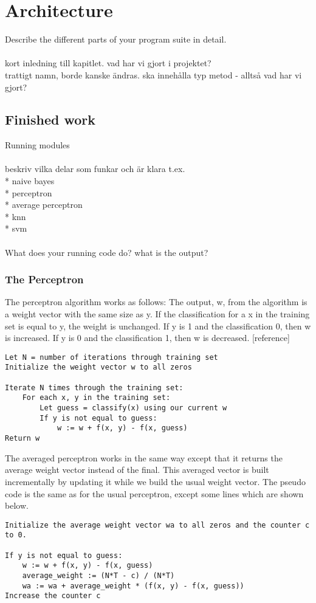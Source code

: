 \chapter{Architecture}
Describe the different parts of your program suite in detail.
\\\\
kort inledning till kapitlet. vad har vi gjort i projektet?\\
trattigt namn, borde kanske ändras. ska innehålla typ metod - alltså vad har vi gjort?

\section{Finished work}
Running modules
\\\\
beskriv vilka delar som funkar och är klara t.ex.\\
* naive bayes\\
* perceptron\\
* average perceptron\\
* knn\\
* svm
\\\\
What does your running code do? what is the output?

\subsection{The Perceptron}
The perceptron algorithm works as follows: 
The output, w, from the algorithm is a weight vector with the same size as y. If the classification for a x in the training set is equal to y, the weight is unchanged.
If y is 1 and the classification 0, then w is increased. If y is 0 and the classification 1, then w is decreased. [reference]
\begin{verbatim}
Let N = number of iterations through training set
Initialize the weight vector w to all zeros

Iterate N times through the training set:
    For each x, y in the training set:
        Let guess = classify(x) using our current w
        If y is not equal to guess:
            w := w + f(x, y) - f(x, guess)
Return w
\end{verbatim}
The averaged perceptron works in the same way except that it returns the average weight vector instead of the final.
This averaged vector is built incrementally by updating it while we build the usual weight vector. The pseudo code is the same as for the usual perceptron, except some lines which are shown below.
\begin{verbatim}
Initialize the average weight vector wa to all zeros and the counter c to 0.

If y is not equal to guess:
    w := w + f(x, y) - f(x, guess)
    average_weight := (N*T - c) / (N*T)
    wa := wa + average_weight * (f(x, y) - f(x, guess))
Increase the counter c
\end{verbatim}


